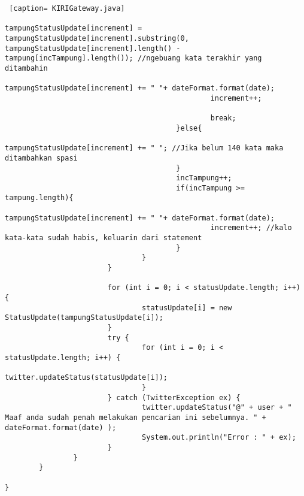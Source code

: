 \begin{lstlisting} [caption= KIRIGateway.java]
												tampungStatusUpdate[increment] = tampungStatusUpdate[increment].substring(0, tampungStatusUpdate[increment].length() - tampung[incTampung].length()); //ngebuang kata terakhir yang ditambahin
												tampungStatusUpdate[increment] += " "+ dateFormat.format(date);
												increment++;
												
												break;
										}else{
												tampungStatusUpdate[increment] += " "; //Jika belum 140 kata maka ditambahkan spasi
										}
										incTampung++;
										if(incTampung >= tampung.length){
												tampungStatusUpdate[increment] += " "+ dateFormat.format(date);
												increment++; //kalo kata-kata sudah habis, keluarin dari statement
										}
								}
						}
						
						for (int i = 0; i < statusUpdate.length; i++) {
								statusUpdate[i] = new StatusUpdate(tampungStatusUpdate[i]);
						}
						try {
								for (int i = 0; i < statusUpdate.length; i++) {
										twitter.updateStatus(statusUpdate[i]);
								}
						} catch (TwitterException ex) {
								twitter.updateStatus("@" + user + " Maaf anda sudah penah melakukan pencarian ini sebelumnya. " + dateFormat.format(date) );
								System.out.println("Error : " + ex);
						}
				}
		}
		
}
\end{lstlisting}
